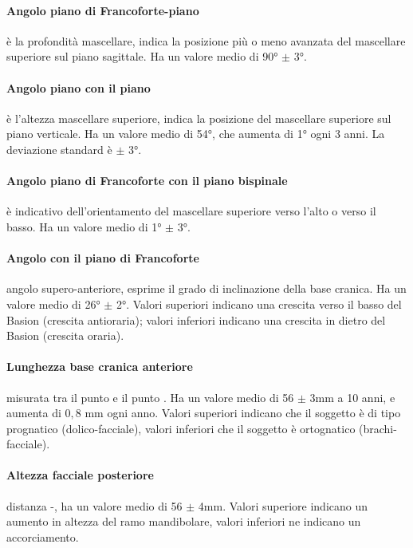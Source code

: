 \paragraph{Angolo piano di Francoforte-piano } è la profondità mascellare, indica la posizione più o meno avanzata del mascellare superiore sul piano sagittale. Ha un valore medio di 90° $\pm$ 3°.

\paragraph{Angolo piano  con il piano } è l'altezza mascellare superiore, indica la posizione del mascellare superiore sul piano verticale. Ha un valore medio di 54°, che aumenta di 1° ogni 3 anni. La deviazione standard è $\pm$ 3°.

\paragraph{Angolo piano di Francoforte con il piano bispinale} è indicativo dell'orientamento del mascellare superiore verso l'alto o verso il basso. Ha un valore medio di 1° $\pm$ 3°.

\paragraph{Angolo  con il piano di Francoforte} angolo supero-anteriore, esprime il grado di inclinazione della base cranica. Ha un valore medio di 26° $\pm$ 2°. Valori superiori indicano una crescita verso il basso del Basion (crescita antioraria); valori inferiori indicano una crescita in dietro del Basion (crescita oraria).

\paragraph{Lunghezza base cranica anteriore} misurata tra il punto  e il punto . Ha un valore medio di 56 $\pm$ 3mm a 10 anni, e aumenta di $0,8$ mm ogni anno. Valori superiori indicano che il soggetto è di tipo prognatico (dolico-facciale), valori inferiori che il soggetto è ortognatico (brachi-facciale).

\paragraph{Altezza facciale posteriore} distanza -, ha un valore medio di 56 $\pm$ 4mm. Valori superiore indicano un aumento in altezza del ramo mandibolare, valori inferiori ne indicano un accorciamento.

